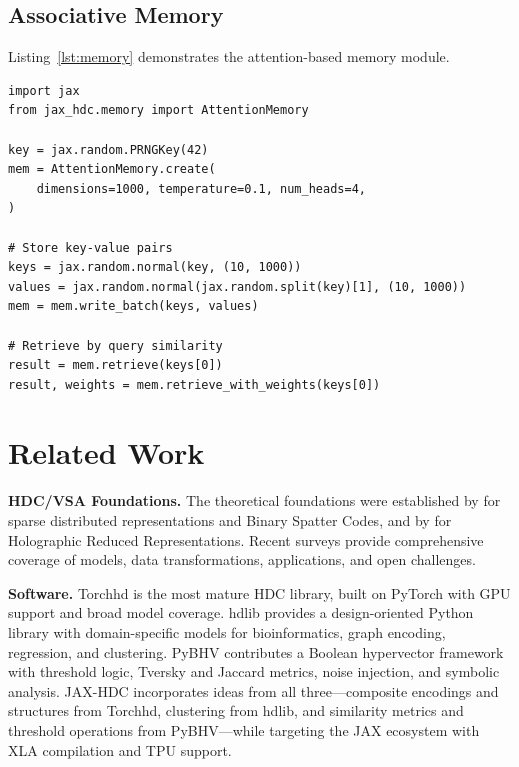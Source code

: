 \documentclass[twoside,11pt]{article}
\begin{document}
\subsection{Associative Memory}

Listing~\ref{lst:memory} demonstrates the attention-based memory module.

\begin{lstlisting}[caption={Attention-based associative memory},label={lst:memory}]
import jax
from jax_hdc.memory import AttentionMemory

key = jax.random.PRNGKey(42)
mem = AttentionMemory.create(
    dimensions=1000, temperature=0.1, num_heads=4,
)

# Store key-value pairs
keys = jax.random.normal(key, (10, 1000))
values = jax.random.normal(jax.random.split(key)[1], (10, 1000))
mem = mem.write_batch(keys, values)

# Retrieve by query similarity
result = mem.retrieve(keys[0])
result, weights = mem.retrieve_with_weights(keys[0])
\end{lstlisting}

\section{Related Work}
\label{sec:related}

\textbf{HDC/VSA Foundations.} The theoretical foundations were established by \citet{kanerva1988sparse, kanerva2009hyperdimensional} for sparse distributed representations and Binary Spatter Codes, and by \citet{plate1991holographic, plate1995holographic} for Holographic Reduced Representations. Recent surveys \citep{kleyko2022survey1, kleyko2022survey2} provide comprehensive coverage of models, data transformations, applications, and open challenges.

\textbf{Software.} Torchhd \citep{heddes2023torchhd} is the most mature HDC library, built on PyTorch with GPU support and broad model coverage. hdlib \citep{cumbo2023hdlib} provides a design-oriented Python library with domain-specific models for bioinformatics, graph encoding, regression, and clustering. PyBHV \citep{vandervorst2023pybhv} contributes a Boolean hypervector framework with threshold logic, Tversky and Jaccard metrics, noise injection, and symbolic analysis. JAX-HDC incorporates ideas from all three---composite encodings and structures from Torchhd, clustering from hdlib, and similarity metrics and threshold operations from PyBHV---while targeting the JAX ecosystem with XLA compilation and TPU support.
\end{document}

